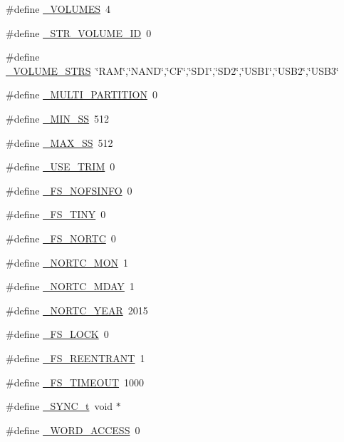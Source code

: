 \begin{DoxyCompactItemize}
\#define \hyperlink{ffconf_8h_a366da9a40c8ceb3103a6b72ca02b9969}{\+\_\+\+V\+O\+L\+U\+M\+E\+S}~4
\item 
\#define \hyperlink{ffconf_8h_ae89b13dba7638cb22b5587fcb335ffe3}{\+\_\+\+S\+T\+R\+\_\+\+V\+O\+L\+U\+M\+E\+\_\+\+I\+D}~0
\item 
\#define \hyperlink{ffconf_8h_a75c97afb8b06935364e42e3ec3fdc6c4}{\+\_\+\+V\+O\+L\+U\+M\+E\+\_\+\+S\+T\+R\+S}~\char`\"{}R\+A\+M\char`\"{},\char`\"{}N\+A\+N\+D\char`\"{},\char`\"{}C\+F\char`\"{},\char`\"{}S\+D1\char`\"{},\char`\"{}S\+D2\char`\"{},\char`\"{}U\+S\+B1\char`\"{},\char`\"{}U\+S\+B2\char`\"{},\char`\"{}U\+S\+B3\char`\"{}
\item 
\#define \hyperlink{ffconf_8h_adc02609ba893fe8706a2f8af0e3a3bb5}{\+\_\+\+M\+U\+L\+T\+I\+\_\+\+P\+A\+R\+T\+I\+T\+I\+O\+N}~0
\item 
\#define \hyperlink{ffconf_8h_ad03aa6d0e294709ae15898ee2c14dc3a}{\+\_\+\+M\+I\+N\+\_\+\+S\+S}~512
\item 
\#define \hyperlink{ffconf_8h_ac271b697378912f17132cb9c7d0de024}{\+\_\+\+M\+A\+X\+\_\+\+S\+S}~512
\item 
\#define \hyperlink{ffconf_8h_a1f93ee7e57bb9d1221f34bfe80e18a61}{\+\_\+\+U\+S\+E\+\_\+\+T\+R\+I\+M}~0
\item 
\#define \hyperlink{ffconf_8h_aaa0caa2085332d2febf0e392559ad138}{\+\_\+\+F\+S\+\_\+\+N\+O\+F\+S\+I\+N\+F\+O}~0
\item 
\#define \hyperlink{ffconf_8h_aa21b30e70610594d3af3a28832b584f6}{\+\_\+\+F\+S\+\_\+\+T\+I\+N\+Y}~0
\item 
\#define \hyperlink{ffconf_8h_a851cace7cfb7afdb4e892230cc075bbd}{\+\_\+\+F\+S\+\_\+\+N\+O\+R\+T\+C}~0
\item 
\#define \hyperlink{ffconf_8h_a47a493ecf767b65199e1425795f1d61d}{\+\_\+\+N\+O\+R\+T\+C\+\_\+\+M\+O\+N}~1
\item 
\#define \hyperlink{ffconf_8h_aa3cf28aa915cb9081fa1aa5b44858dd6}{\+\_\+\+N\+O\+R\+T\+C\+\_\+\+M\+D\+A\+Y}~1
\item 
\#define \hyperlink{ffconf_8h_add853644b85a7633bb782dfddb51bda5}{\+\_\+\+N\+O\+R\+T\+C\+\_\+\+Y\+E\+A\+R}~2015
\item 
\#define \hyperlink{ffconf_8h_a01410fcb45c2d2d2c5692c56d4f0a481}{\+\_\+\+F\+S\+\_\+\+L\+O\+C\+K}~0
\item 
\#define \hyperlink{ffconf_8h_a4e07d7fcae4241b73eb5b70fab5f676d}{\+\_\+\+F\+S\+\_\+\+R\+E\+E\+N\+T\+R\+A\+N\+T}~1
\item 
\#define \hyperlink{ffconf_8h_a526e3cac667f53cc9a48507873348e60}{\+\_\+\+F\+S\+\_\+\+T\+I\+M\+E\+O\+U\+T}~1000
\item 
\#define \hyperlink{ffconf_8h_a9a3f0670343e51652dd12b18fa90a9eb}{\+\_\+\+S\+Y\+N\+C\+\_\+t}~void $\ast$
\item 
\#define \hyperlink{ffconf_8h_a943a47fa5ed8073725b45e49e5634dea}{\+\_\+\+W\+O\+R\+D\+\_\+\+A\+C\+C\+E\+S\+S}~0
\end{DoxyCompactItemize}


